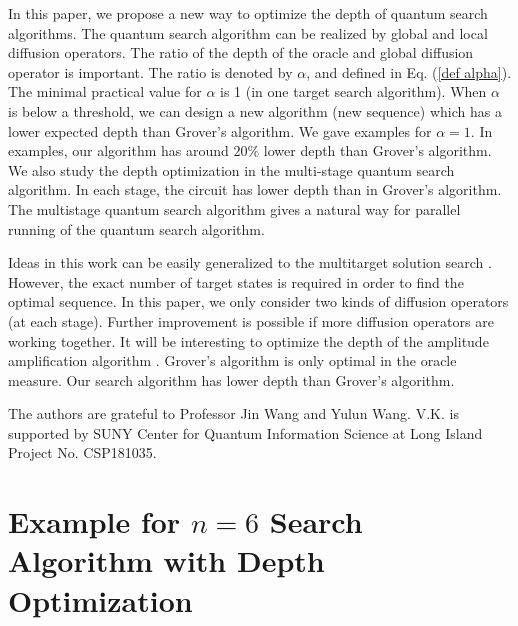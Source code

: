 \documentclass[%
 twocolumn,
 10pt,
 superscriptaddress,
 longbibliography,
 amsmath,amssymb,
 aps,
 pra,
floatfix,
]{revtex4-1}
\begin{document}
In this paper, we propose a new way to optimize the depth of quantum search algorithms. The quantum search algorithm can be realized by global and local diffusion operators. The ratio of the depth of the oracle and  global diffusion operator is important. The ratio is denoted by $\alpha$, and  defined in Eq. (\ref{def alpha}). The minimal practical value for $\alpha$ is 1 (in one target search algorithm). When $\alpha$ is below a threshold, we can design a new algorithm (new sequence) which has a lower expected depth than Grover's algorithm. We gave examples for $\alpha=1$. In examples, our algorithm has around $20\%$ lower depth than Grover's algorithm. We also study the depth optimization in the multi-stage quantum search algorithm. In each stage, the circuit has lower depth than in Grover's algorithm. The multistage quantum search algorithm gives a natural way for parallel running of the quantum search algorithm. 

Ideas in this work can be easily generalized to the multitarget solution search \cite{BBHT98}. However, the exact number of target states is required in order to find the optimal sequence. In this paper, we only consider two kinds of diffusion operators (at each stage). Further improvement is possible if more diffusion operators are working together. It will be interesting to optimize the depth of the amplitude amplification algorithm \cite{Grover98,BHMT00}. Grover's algorithm is only optimal in the oracle measure. Our search algorithm has lower depth than Grover's algorithm.

\begin{acknowledgments}

The authors are grateful to Professor Jin Wang and Yulun Wang. V.K. is supported by SUNY Center for Quantum Information Science at Long Island Project No. CSP181035.
	
\end{acknowledgments}


\appendix

\section{\label{Appendix examples 6} Example for \texorpdfstring{$n=6$}{Lg} Search Algorithm with Depth Optimization}
\end{document}
